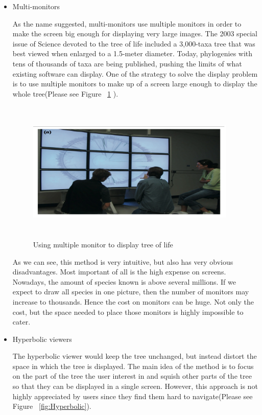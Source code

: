 \documentclass[MSc]{icldt}
\begin{document}
\begin{itemize}
  \item Multi-monitors

  As the name suggested, multi-monitors use multiple monitors in order to make the screen big enough for displaying very large images. The 2003 special issue of Science devoted to the tree of life included a 3,000-taxa tree that was best viewed when enlarged to a 1.5-meter diameter.\cite{multipleMonitoring} Today, phylogenies with tens of thousands of taxa are being published\cite{multipleMonitoring2}, pushing the limits of what existing software can display. One of the strategy to solve the display problem is to use multiple monitors to make up of a screen large enough to display the whole tree(Please see Figure ~\ref{fig:multipleMonitoring} ).
  
  \begin{figure}[H]
  \centering
  \includegraphics [width=10cm,height=6.8cm]{MultipleMonitoring}
  \caption{Using multiple monitor to display tree of life}
  \label{fig:multipleMonitoring}
\end{figure}
  
  As we can see, this method is very intuitive, but also has very obvious disadvantages. Most important of all is the high expense on screens. Nowadays, the amount of species known is above several millions. If we expect to draw all species in one picture, then the number of monitors may increase to thousands. Hence the cost on monitors can be huge. Not only the cost, but the space needed to place those monitors is highly impossible to cater.
  
  \item Hyperbolic viewers
  
  The hyperbolic viewer would keep the tree unchanged, but instead distort the space in which the tree is displayed.\cite{euclidean} The main idea of the method is to focus on the part of the tree the user interest in and squish other parts of the tree so that they can be displayed in a single screen. However, this approach is not highly appreciated by users since they find them hard to navigate(Please see Figure ~\ref{fig:Hyperbolic}).
  

\end{itemize}
\end{document}
